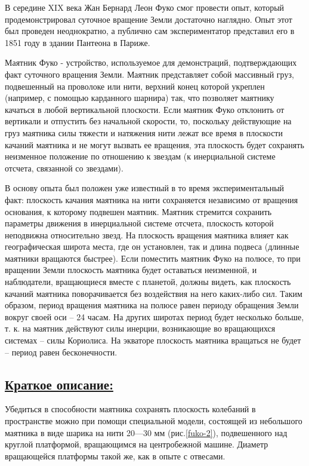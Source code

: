\documentclass[14pt,a4paper,oneside]{extarticle}	%
\begin{document}
В середине XIX века Жан Бернард Леон Фуко смог провести опыт, который продемонстрировал суточное вращение Земли достаточно наглядно. 
Опыт этот был проведен неоднократно, а публично сам экспериментатор представил его в 1851 году в здании Пантеона в Париже.
									
Маятник Фуко - устройство, используемое для демонстраций, подтверждающих факт суточного вращения Земли.
Маятник представляет собой массивный груз, подвешенный на проволоке или нити, верхний конец которой укреплен (например, с помощью карданного шарнира) так, что позволяет маятнику качаться в любой вертикальной плоскости. 
Если маятник Фуко отклонить от вертикали и отпустить без начальной скорости, то, 
			поскольку действующие на груз маятника силы тяжести и натяжения нити лежат все время в плоскости качаний маятника и не могут вызвать ее вращения, эта плоскость будет сохранять неизменное положение
			по отношению к звездам (к инерциальной системе отсчета, связанной со звездами). 
			
В основу опыта был положен уже известный в то время экспериментальный факт: 
плоскость качания маятника на нити сохраняется независимо от вращения основания, к которому подвешен маятник. 
Маятник стремится сохранить параметры движения в инерциальной системе отсчета, плоскость которой неподвижна относительно звезд. 
На плоскость вращения маятника влияет как географическая широта места, где он установлен, так и длина подвеса (длинные маятники вращаются быстрее).	
Если поместить маятник Фуко на полюсе, то при вращении Земли плоскость маятника будет 
оставаться неизменной, и наблюдатели, вращающиеся вместе с планетой, должны видеть, 
как плоскость качаний маятника поворачивается без воздействия на него каких-либо сил. 
Таким образом, период вращения маятника на полюсе равен периоду обращения Земли вокруг своей оси – 24 часам. 
На других широтах период будет несколько больше, т. к. на маятник действуют силы инерции, возникающие во вращающихся системах – силы Кориолиса. 
На экваторе плоскость маятника вращаться не будет – период равен бесконечности.

	\newpage
	\subsection*{\underline{Краткое описание:}}
	
	Убедиться в способности маятника сохранять плоскость колебаний в пространстве можно при помощи специальной модели, состоящей 
	из небольшого маятника в виде шарика на нити 20—30 мм (рис.\ref{fuko-2}), подвешенного над круглой платформой, вращающимся на центробежной машине.
	Диаметр вращающейся платформы такой же, как в опыте с отвесами.
	
\end{document}
